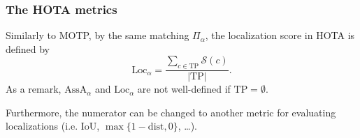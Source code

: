 \documentclass[slidetop, mathserif]{beamer}
\begin{document}
\begin{frame}
	\frametitle{The HOTA metrics}
		
	Similarly to MOTP, by the same matching $\Pi_\alpha$,
	the localization score in HOTA is defined by
	\[
		\text{Loc}_\alpha = \dfrac{\sum_{c\in\text{TP}} \mathcal S(c)}{|\text{TP}|}.
	\]
	As a remark, $\text{AssA}_\alpha$ and $\text{Loc}_\alpha$ are not well-defined
	if $\text{TP} = \emptyset$.

	\vspace{4pt}

	Furthermore, the numerator can be changed to another metric for evaluating localizations
	(i.e. IoU, $\max\{1-\text{dist},0\}$, \ldots).
		
\end{frame}



	
	
	
	
\end{document}

